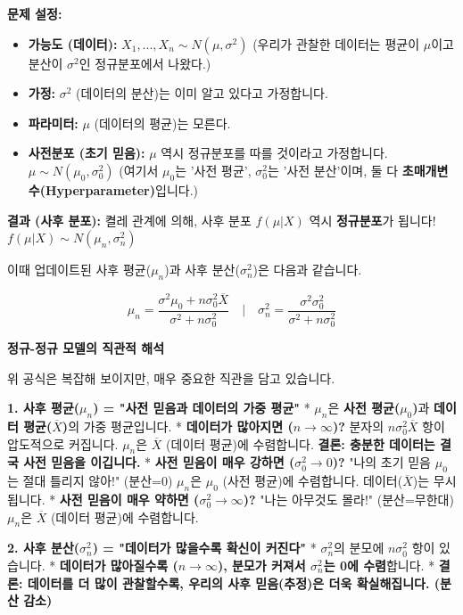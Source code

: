 \documentclass[11pt,a4paper]{book}
\theoremstyle{definition}
\begin{document}
\textbf{문제 설정:}
\begin{itemize}
    \item \textbf{가능도 (데이터):} $X_1, ..., X_n \sim N(\mu, \sigma^2)$
        (우리가 관찰한 데이터는 평균이 $\mu$이고 분산이 $\sigma^2$인 정규분포에서 나왔다.)
    \item \textbf{가정:} $\sigma^2$ (데이터의 분산)는 이미 알고 있다고 가정합니다.
    \item \textbf{파라미터:} $\mu$ (데이터의 평균)는 모른다.
    \item \textbf{사전분포 (초기 믿음):} $\mu$ 역시 정규분포를 따를 것이라고 가정합니다.
        $\mu \sim N(\mu_0, \sigma_0^2)$
        (여기서 $\mu_0$는 '사전 평균', $\sigma_0^2$는 '사전 분산'이며, 둘 다 \textbf{초매개변수(Hyperparameter)}입니다.)
\end{itemize}

\textbf{결과 (사후 분포):}
켤레 관계에 의해, 사후 분포 $f(\mu | X)$ 역시 \textbf{정규분포}가 됩니다!
$f(\mu | X) \sim N(\mu_n, \sigma_n^2)$

이때 업데이트된 사후 평균($\mu_n$)과 사후 분산($\sigma_n^2$)은 다음과 같습니다.

$$ \mu_n = \frac{\sigma^2 \mu_0 + n \sigma_0^2 \overline{X}}{\sigma^2 + n \sigma_0^2} \quad | \quad \sigma_n^2 = \frac{\sigma^2 \sigma_0^2}{\sigma^2 + n \sigma_0^2} $$

\begin{summarybox}
    \textbf{정규-정규 모델의 직관적 해석}
    
    위 공식은 복잡해 보이지만, 매우 중요한 직관을 담고 있습니다.
    
    \textbf{1. 사후 평균($\mu_n$) = "사전 믿음과 데이터의 가중 평균"}
    * $\mu_n$은 \textbf{사전 평균($\mu_0$)}과 \textbf{데이터 평균($\overline{X}$)}의 가중 평균입니다.
    * \textbf{데이터가 많아지면 ($n \to \infty$)?}
        분자의 $n \sigma_0^2 \overline{X}$ 항이 압도적으로 커집니다.
        $\mu_n$은 $\overline{X}$ (데이터 평균)에 수렴합니다.
        \textbf{결론: 충분한 데이터는 결국 사전 믿음을 이깁니다.}
    * \textbf{사전 믿음이 매우 강하면 ($\sigma_0^2 \to 0$)?}
        "나의 초기 믿음 $\mu_0$는 절대 틀리지 않아!" (분산=0)
        $\mu_n$은 $\mu_0$ (사전 평균)에 수렴합니다. 데이터($\overline{X}$)는 무시됩니다.
    * \textbf{사전 믿음이 매우 약하면 ($\sigma_0^2 \to \infty$)?}
        "나는 아무것도 몰라!" (분산=무한대)
        $\mu_n$은 $\overline{X}$ (데이터 평균)에 수렴합니다.
        
    \textbf{2. 사후 분산($\sigma_n^2$) = "데이터가 많을수록 확신이 커진다"}
    * $\sigma_n^2$의 분모에 $n \sigma_0^2$ 항이 있습니다.
    * \textbf{데이터가 많아질수록 ($n \to \infty$), 분모가 커져서 $\sigma_n^2$는 0에 수렴}합니다.
    * \textbf{결론: 데이터를 더 많이 관찰할수록, 우리의 사후 믿음(추정)은 더욱 확실해집니다. (분산 감소)}
\end{summarybox}
\end{document}
